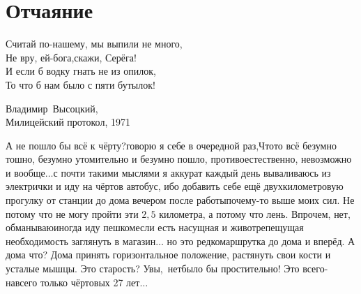 \chapter{Отчаяние} 
\vepsianrose

\setlength{\epigraphwidth}{0.7\textwidth}

\epigraph{%
	Считай по-нашему, мы выпили не много,\mdash\\
	Не вру, ей-бога,\mdash скажи, Серёга!\\
	И если б водку гнать не из опилок,\\
	То что б нам было с пяти бутылок!}
	{
	\begin{flushright}
		\small{Владимир~Высоцкий,\\Милицейский протокол, 1971}
	\end{flushright}
	}


\diagdash А не пошло бы всё к чёрту?\mdash говорю я себе в очередной раз,\mdash Что\sdash то всё безумно тошно, безумно утомительно и безумно пошло, противоестественно, невозможно и вообще$\ldots$\mdash с почти такими мыслями я аккурат каждый день вываливаюсь из электрички и иду на чёртов автобус, ибо добавить себе ещё двухкилометровую прогулку от станции до дома вечером после работы\mdash почему-то выше моих сил.
Не потому что не могу пройти эти ${2,5}$ километра, а потому что лень. Впрочем, нет, обманываю\mdash иногда иду пешком\mdash если есть насущная и животрепещущая необходимость заглянуть в магазин$\ldots$ но это редко\mdash маршрутка до дома и вперёд. %
А дома что? Дома принять горизонтальное положение, растянуть свои кости и усталые мышцы. Это старость? Увы,~нет\mdash было бы простительно! Это всего-навсего только чёртовых 27 лет$\ldots$

